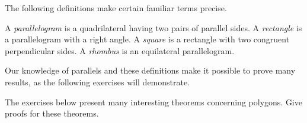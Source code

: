 \documentclass[11pt]{book}
\theoremstyle{bkplain}
\theoremstyle{XIplainnote}
\theoremstyle{bkplain}
\theoremstyle{bkplain}
\begin{document}
The following definitions make certain familiar terms precise.

\begin{definition}
A \emph{parallelogram} is a quadrilateral having two pairs of parallel sides.
A \emph{rectangle} is a parallelogram with a right angle. A \emph{square} is a
rectangle with two congruent perpendicular sides. A \emph{rhombus} is an
equilateral parallelogram.
\end{definition}

\FIGVIIITWENTYFIVE

Our knowledge of parallels and these definitions make it possible to prove
many results, as the following exercises will demonstrate.

\noindent The exercises below present many interesting theorems concerning
polygons. Give proofs for these theorems.
\end{document}
